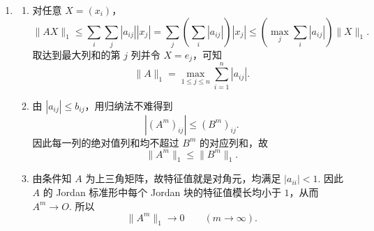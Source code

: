 \begin{enumerate}
\begin{enumerate}
        \item 垂直当且仅当 $\vec{n_1}\cdot \vec{n_2}=0$，即
        \[
            -2-8+2c=0\implies c=5, \forall \, d \in \mathbf{R}.
        \]

        \item 相交当且仅当 $c\neq -4$. 此时由两方程消去得 $z=\dfrac{2d-1}{c+4}$. 令 $y=t$，则交线参数方程可写为
        \[
            \begin{cases}
                x=2t-d-\dfrac{2(2d-1)}{c+4},\\
                y=t,\\
                z=\dfrac{2d-1}{c+4}.
            \end{cases}
        \]

        \item 仍需 $c\neq -4$. 原点到交线的距离平方等于
        \[
            \begin{pmatrix}-d&-1\end{pmatrix}
            (NN^{\mathrm{T}})^{-1}
            \begin{pmatrix}-d\\-1\end{pmatrix},
            \quad
            N=\begin{pmatrix}1&-2&2\\-2&4&c\end{pmatrix}.
        \]
        计算得条件为
        \[
            \frac{(c^2+20)d^2+(20-4c)d+9}{5(c+4)^2}=1,
            \qquad c\neq -4.
        \]
    \end{enumerate}

    \item
    \begin{enumerate}
        \item 对任意 $X=(x_i)$，
        \[
            \|AX\|_1\leqslant \sum_i\sum_j |a_{ij}||x_j|
            =\sum_j\left(\sum_i|a_{ij}|\right)|x_j|
            \leqslant \left(\max_j\sum_i|a_{ij}|\right)\|X\|_1.
        \]
        取达到最大列和的第 $j$ 列并令 $X=e_j$，可知
        \[
            \|A\|_1=\max_{1\leqslant j\leqslant n}\sum_{i=1}^n|a_{ij}|.
        \]

        \item 由 $|a_{ij}|\leqslant b_{ij}$，用归纳法不难得到
        \[
            |(A^m)_{ij}|\leqslant (B^m)_{ij}.
        \]
        因此每一列的绝对值列和均不超过 $B^m$ 的对应列和，故
        \[
            \|A^m\|_1\leqslant \|B^m\|_1.
        \]

        \item 由条件知 $A$ 为上三角矩阵，故特征值就是对角元，均满足 $|a_{ii}|<1$. 因此 $A$ 的 Jordan 标准形中每个 Jordan 块的特征值模长均小于 $1$，从而 $A^m\to O$. 所以
        \[
            \|A^m\|_1\to 0\qquad(m\to\infty).
        \]
    \end{enumerate}
\end{enumerate}

\clearpage
